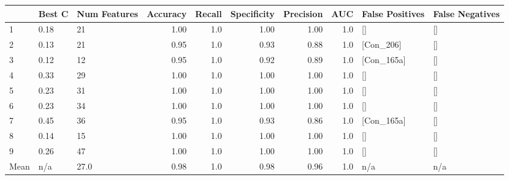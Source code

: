 \begin{tabular}{lllrrrrrll}
\toprule
{} & Best C & Num Features &  Accuracy &  Recall &  Specificity &  Precision &  AUC & False Positives & False Negatives \\
\midrule
1    &   0.18 &           21 &      1.00 &     1.0 &         1.00 &       1.00 &  1.0 &              [] &              [] \\
2    &   0.13 &           21 &      0.95 &     1.0 &         0.93 &       0.88 &  1.0 &       [Con\_206] &              [] \\
3    &   0.12 &           12 &      0.95 &     1.0 &         0.92 &       0.89 &  1.0 &      [Con\_165a] &              [] \\
4    &   0.33 &           29 &      1.00 &     1.0 &         1.00 &       1.00 &  1.0 &              [] &              [] \\
5    &   0.23 &           31 &      1.00 &     1.0 &         1.00 &       1.00 &  1.0 &              [] &              [] \\
6    &   0.23 &           34 &      1.00 &     1.0 &         1.00 &       1.00 &  1.0 &              [] &              [] \\
7    &   0.45 &           36 &      0.95 &     1.0 &         0.93 &       0.86 &  1.0 &      [Con\_165a] &              [] \\
8    &   0.14 &           15 &      1.00 &     1.0 &         1.00 &       1.00 &  1.0 &              [] &              [] \\
9    &   0.26 &           47 &      1.00 &     1.0 &         1.00 &       1.00 &  1.0 &              [] &              [] \\
Mean &    n/a &         27.0 &      0.98 &     1.0 &         0.98 &       0.96 &  1.0 &             n/a &             n/a \\
\bottomrule
\end{tabular}

